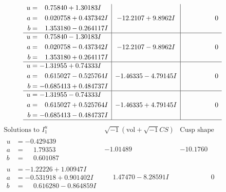\documentclass[1p]{elsarticle_modified}
\theoremstyle{definition}
\newcommand{\I}{\sqrt{-1}}
\begin{document}
$$\begin{array}{c|c|c}
\begin{aligned}
u &= \phantom{-}0.75840 + 1.30183 I \\
a &= \phantom{-}0.020758 + 0.437342 I \\
b &= \phantom{-}1.353180 - 0.264117 I\end{aligned}
 & -12.2107 + 9.8962 I & \phantom{-0.000000 } 0 \\ \hline\begin{aligned}
u &= \phantom{-}0.75840 - 1.30183 I \\
a &= \phantom{-}0.020758 - 0.437342 I \\
b &= \phantom{-}1.353180 + 0.264117 I\end{aligned}
 & -12.2107 - 9.8962 I & \phantom{-0.000000 } 0 \\ \hline\begin{aligned}
u &= -1.31955 + 0.74333 I \\
a &= \phantom{-}0.615027 - 0.525764 I \\
b &= -0.685413 + 0.484737 I\end{aligned}
 & -1.46335 - 4.79145 I & \phantom{-0.000000 } 0 \\ \hline\begin{aligned}
u &= -1.31955 - 0.74333 I \\
a &= \phantom{-}0.615027 + 0.525764 I \\
b &= -0.685413 - 0.484737 I\end{aligned}
 & -1.46335 + 4.79145 I & \phantom{-0.000000 } 0\\
 \hline 
 \end{array}$$\newpage$$\begin{array}{c|c|c}  
\text{Solutions to }I^u_{1}& \I (\text{vol} + \sqrt{-1}CS) & \text{Cusp shape}\\
 \hline 
\begin{aligned}
u &= -0.429439\phantom{ +0.000000I} \\
a &= \phantom{-}1.79353\phantom{ +0.000000I} \\
b &= \phantom{-}0.601087\phantom{ +0.000000I}\end{aligned}
 & -1.01489\phantom{ +0.000000I} & -10.1760\phantom{ +0.000000I} \\ \hline\begin{aligned}
u &= -1.22226 + 1.00947 I \\
a &= -0.531918 + 0.901402 I \\
b &= \phantom{-}0.616280 - 0.864859 I\end{aligned}
 & \phantom{-}1.47470 - 8.28591 I & \phantom{-0.000000 } 0 \\ \hline\begin{aligned}

\end{aligned}
\end{array}$$
\end{document}
